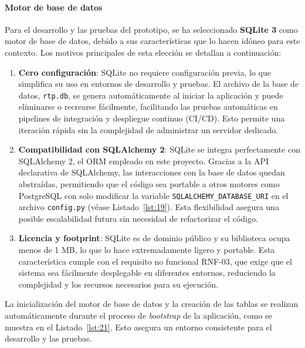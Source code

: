\paragraph*{Motor de base de datos}

Para el desarrollo y las pruebas del prototipo, se ha seleccionado \textbf{SQLite 3} como motor de base de datos, debido a sus características que lo hacen idóneo para este contexto. Los motivos principales de esta elección se detallan a continuación:

\begin{enumerate}
    \item \textbf{Cero configuración}: SQLite no requiere configuración previa, lo que simplifica su uso en entornos de desarrollo y pruebas. El archivo de la base de datos, \texttt{rtp.db}, se genera automáticamente al iniciar la aplicación y puede eliminarse o recrearse fácilmente, facilitando las pruebas automáticas en pipelines de integración y despliegue continuo (CI/CD). Esto permite una iteración rápida sin la complejidad de administrar un servidor dedicado.
    
    \item \textbf{Compatibilidad con SQLAlchemy 2}: SQLite se integra perfectamente con SQLAlchemy 2, el ORM empleado en este proyecto. Gracias a la API declarativa de SQLAlchemy, las interacciones con la base de datos quedan abstraídas, permitiendo que el código sea portable a otros motores como PostgreSQL con solo modificar la variable \texttt{SQLALCHEMY\_DATABASE\_URI} en el archivo \texttt{config.py} (véase Listado~\ref{lst:19}). Esta flexibilidad asegura una posible escalabilidad futura sin necesidad de refactorizar el código.
    
    \item \textbf{Licencia y footprint}: SQLite es de dominio público y su biblioteca ocupa menos de 1 MB, lo que lo hace extremadamente ligero y portable. Esta característica cumple con el requisito no funcional RNF-03, que exige que el sistema sea fácilmente desplegable en diferentes entornos, reduciendo la complejidad y los recursos necesarios para su ejecución.
\end{enumerate}

La inicialización del motor de base de datos y la creación de las tablas se realizan automáticamente durante el proceso de \emph{bootstrap} de la aplicación, como se muestra en el Listado~\ref{lst:21}. Esto asegura un entorno consistente para el desarrollo y las pruebas.

